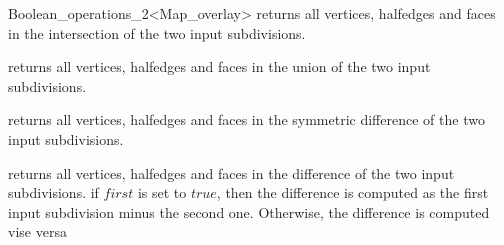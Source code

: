 \begin{ccRefClass}{Boolean_operations_2<Map_overlay>}
{returns all vertices, halfedges and faces in the intersection of the two input subdivisions.}

{returns all vertices, halfedges and faces in the union of the two input subdivisions.}

{returns all vertices, halfedges and faces in the symmetric difference of the two input subdivisions.}

{returns all vertices, halfedges and faces in the difference of the two input subdivisions.
   if $first$ is set to $true$, then the difference is computed as the first input subdivision 
   minus the second one. Otherwise, the difference is computed vise versa}

\ccSeeAlso
{}

\end{ccRefClass}

\ccRefPageEnd






